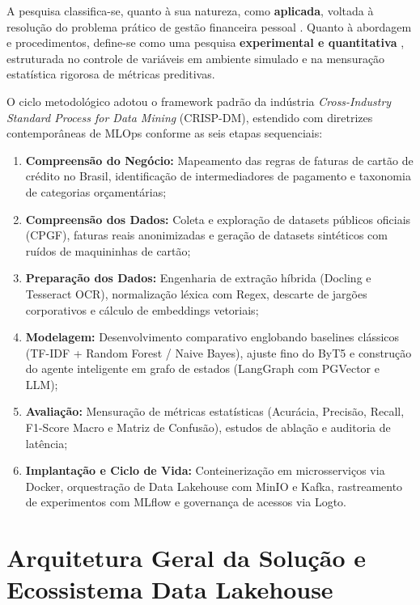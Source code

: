 \documentclass[
	12pt,				
	openright,			
	oneside,			
	a4paper,			
	english,			
	brazil				
	]{abntex2}
\begin{document}
A pesquisa classifica-se, quanto à sua natureza, como \textbf{aplicada}, voltada à resolução do problema prático de gestão financeira pessoal \cite{gerhardt2009metodos}. Quanto à abordagem e procedimentos, define-se como uma pesquisa \textbf{experimental e quantitativa} \cite{gil2019metodos}, estruturada no controle de variáveis em ambiente simulado e na mensuração estatística rigorosa de métricas preditivas.

O ciclo metodológico adotou o framework padrão da indústria \textit{Cross-Industry Standard Process for Data Mining} (CRISP-DM), estendido com diretrizes contemporâneas de MLOps \cite{kreuzberger2022mlops} conforme as seis etapas sequenciais:
\begin{enumerate}
    \item \textbf{Compreensão do Negócio:} Mapeamento das regras de faturas de cartão de crédito no Brasil, identificação de intermediadores de pagamento e taxonomia de categorias orçamentárias;
    \item \textbf{Compreensão dos Dados:} Coleta e exploração de datasets públicos oficiais (CPGF), faturas reais anonimizadas e geração de datasets sintéticos com ruídos de maquininhas de cartão;
    \item \textbf{Preparação dos Dados:} Engenharia de extração híbrida (Docling e Tesseract OCR), normalização léxica com Regex, descarte de jargões corporativos e cálculo de embeddings vetoriais;
    \item \textbf{Modelagem:} Desenvolvimento comparativo englobando baselines clássicos (TF-IDF + Random Forest / Naive Bayes), ajuste fino do ByT5 e construção do agente inteligente em grafo de estados (LangGraph com PGVector e LLM);
    \item \textbf{Avaliação:} Mensuração de métricas estatísticas (Acurácia, Precisão, Recall, F1-Score Macro e Matriz de Confusão), estudos de ablação e auditoria de latência;
    \item \textbf{Implantação e Ciclo de Vida:} Conteinerização em microsserviços via Docker, orquestração de Data Lakehouse com MinIO e Kafka, rastreamento de experimentos com MLflow e governança de acessos via Logto.
\end{enumerate}

\section{Arquitetura Geral da Solução e Ecossistema Data Lakehouse}
\label{sec:sol_arquitetura}
\end{document}
